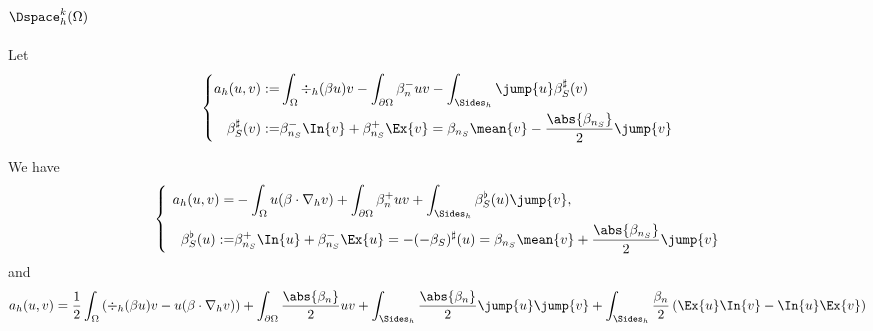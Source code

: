 \subsection{$\Dspace^k_h(\Omega)$}\label{subsec:}
%
Let
%
\begin{equation}\label{eq:transportdg_primal}
%
\left\{
\begin{aligned}
a_h(u,v) :=& \int_{\Omega}\div_h(\beta u) v - \int_{\partial\Omega} \beta_n^- uv - \int_{\Sides_h}\jump{u}\beta_S^{\sharp}(v)
\\ 
\beta_S^{\sharp}(v) :=& \beta_{n_S}^{-}\In{v} + \beta_{n_S}^{+}\Ex{v} 
= \beta_{n_S}\mean{v} - \frac{\abs{\beta_{n_S}}}{2}\jump{v}
\end{aligned}
\right.
%
\end{equation}
%
\begin{lemma}\label{lemma:}
We have
%
\begin{equation}\label{eq:transportdg_dual}
\left\{
\begin{aligned}
a_h(u,v) =& - \int_{\Omega}u (\beta\cdot\nabla_h v) + \int_{\partial\Omega} \beta_n^+ uv  + \int_{\Sides_h}\beta_S^{\flat}(u) \jump{v},\\
\quad \beta_S^{\flat}(u) :=& \beta_{n_S}^{+}\In{u} + \beta_{n_S}^{-}\Ex{u} = -(-\beta_S)^{\sharp}(u)
= \beta_{n_S}\mean{v} + \frac{\abs{\beta_{n_S}}}{2}\jump{v}
\end{aligned}
\right.
\end{equation}
%
and
%
\begin{equation}\label{eq:transportdg_cons}
a_h(u,v) = \frac12\int_{\Omega}\left( \div_h(\beta u) v - u (\beta\cdot\nabla_h v)\right)
+ \int_{\partial\Omega} \frac{\abs{\beta_n}}{2} uv + \int_{\Sides_h}\frac{\abs{\beta_n}}{2}\jump{u} \jump{v}
+ \int_{\Sides_h}\frac{\beta_n}{2}\left(\Ex{u}\In{v}-\In{u}\Ex{v}\right)
\end{equation}
%
\end{lemma}
%
